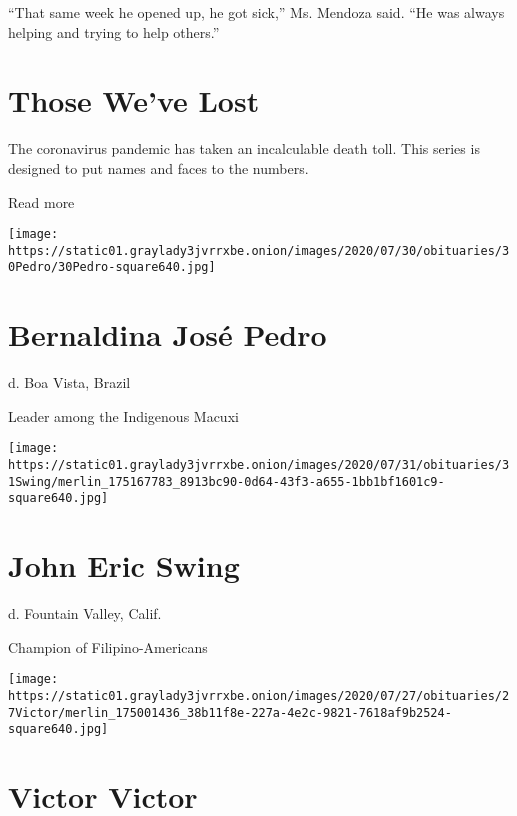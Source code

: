 ``That same week he opened up, he got sick,'' Ms. Mendoza said. ``He was
always helping and trying to help others.''

\href{https://www.nytimes3xbfgragh.onion/interactive/2020/obituaries/people-died-coronavirus-obituaries.html?action=click\&pgtype=Article\&state=default\&region=BELOW_MAIN_CONTENT\&context=covid_obits_promo}{}

\hypertarget{those-weve-lost}{%
\section{Those We've Lost}\label{those-weve-lost}}

The coronavirus pandemic has taken an incalculable death toll. This
series is designed to put names and faces to the numbers.

Read more

\texttt{[image: https://static01.graylady3jvrrxbe.onion/images/2020/07/30/obituaries/30Pedro/30Pedro-square640.jpg]}

\hypertarget{bernaldina-josuxe9-pedro}{%
\section{Bernaldina José Pedro}\label{bernaldina-josuxe9-pedro}}

d. Boa Vista, Brazil

Leader among the Indigenous Macuxi

\texttt{[image: https://static01.graylady3jvrrxbe.onion/images/2020/07/31/obituaries/31Swing/merlin\_175167783\_8913bc90-0d64-43f3-a655-1bb1bf1601c9-square640.jpg]}

\hypertarget{john-eric-swing}{%
\section{John Eric Swing}\label{john-eric-swing}}

d. Fountain Valley, Calif.

Champion of Filipino-Americans

\texttt{[image: https://static01.graylady3jvrrxbe.onion/images/2020/07/27/obituaries/27Victor/merlin\_175001436\_38b11f8e-227a-4e2c-9821-7618af9b2524-square640.jpg]}

\hypertarget{victor-victor}{%
\section{Victor Victor}\label{victor-victor}}

